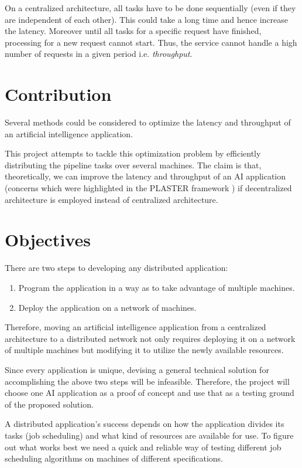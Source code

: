 \documentclass{report}
\begin{document}
On a centralized architecture, all tasks have to be done sequentially (even if they are independent of each other). This could take a long time and hence increase the latency. Moreover until all tasks for a specific request have finished, processing for a new request cannot start. Thus, the service cannot handle a high number of requests in a given period i.e. \textit{throughput}.

\section{Contribution}

Several methods could be considered to optimize the latency and throughput of an artificial intelligence application.

This project attempts to tackle this optimization problem by efficiently distributing the pipeline tasks over several machines. The claim is that, theoretically, we can improve the latency and throughput of an AI application (concerns which were highlighted in the PLASTER framework \cite{Teich2018}) if decentralized architecture is employed instead of centralized architecture.

\section{Objectives}\label{objectives}

There are two steps to developing any distributed application:
\begin{enumerate}
  \item Program the application in a way as to take advantage of multiple machines.
  \item Deploy the application on a network of machines.
\end{enumerate}

Therefore, moving an artificial intelligence application from a centralized architecture to a distributed network not only requires deploying it on a network of multiple machines but modifying it to utilize the newly available resources.

Since every application is unique, devising a general technical solution for accomplishing the above two steps will be infeasible. Therefore, the project will choose one AI application as a proof of concept and use that as a testing ground of the proposed solution.

A distributed application's success depends on how the application divides its tasks (job scheduling) and what kind of resources are available for use. To figure out what works best we need a quick and reliable way of testing different job scheduling algorithms on machines of different specifications.
\end{document}
